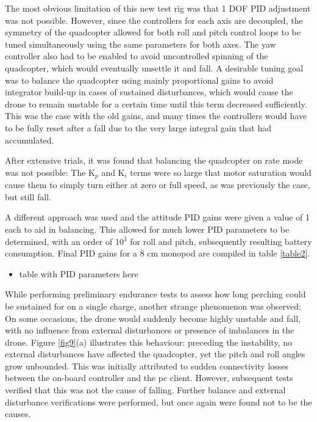 \documentclass[12pt,a4paper]{article}
\begin{document}
The most obvious limitation of this new test rig was that 1 DOF PID adjustment was not possible. However, since the controllers for each axis are decoupled, the symmetry of the quadcopter allowed for both roll and pitch control loops to be tuned simultaneously using the same parameters for both axes. The yaw controller also had to be enabled to avoid uncontrolled spinning of the quadcopter, which would eventually unsettle it and fall. A desirable tuning goal was to balance the quadcopter using mainly proportional gains to avoid integrator build-up in cases of sustained disturbances, which would cause the drone to remain unstable for a certain time until this term decreased sufficiently. This was the case with the old gains, and many times the controllers would have to be fully reset after a fall due to the very large integral gain that had accumulated.

After extensive trials, it was found that balancing the quadcopter on rate mode was not possible: The K$_p$ and K$_i$ terms were so large that motor saturation would cause them to simply turn either at zero or full speed, as was previously the case, but still fall. 

A different approach was used and the attitude PID gains were given a value of 1 each to aid in balancing. This allowed for much lower PID parameters to be determined, with an order of 10$^3$ for roll and pitch, subsequently resulting battery consumption. Final PID gains for a 8 cm monopod are compiled in table \ref{table2}. 

\begin{itemize}
\item table with PID parameters here
\end{itemize}

While performing preliminary endurance tests to assess how long perching could be sustained for on a single charge, another strange phenomenon was observed: On some occasions, the drone would suddenly become highly unstable and fall, with no influence from external disturbances or presence of imbalances in the drone. Figure \ref{fig9}(a) illustrates this behaviour: preceding the instability, no external disturbances have affected the quadcopter, yet the pitch and roll angles grow unbounded. This was initially attributed to sudden connectivity losses between the on-board controller and the pc client. However, subsequent tests verified that this was not the cause of falling. Further balance and external disturbance verifications were performed, but once again were found not to be the causes.
\end{document}
